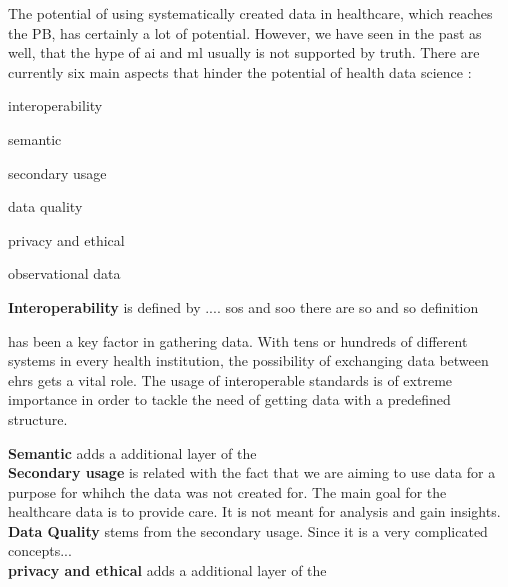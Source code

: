 The potential of using systematically created data in healthcare, which reaches the PB, has certainly a lot of potential. However, we have seen in the past as well, that the hype of \ac{ai} and \ac{ml} usually is not supported by truth. There are currently six main aspects that hinder the potential of health data science \cite{panchInconvenientTruthAI2019,peekThreeControversiesHealth2018}:
\begin{myitemize}
    \item interoperability
    \item semantic
    \item secondary usage
    \item data quality
    \item privacy and ethical
    \item observational data
\end{myitemize}

\textbf{Interoperability} is defined by .... sos and soo
there are so and so definition



has been a key factor in gathering data. With tens or hundreds of different systems in every health institution, the possibility of exchanging data between \acp{ehr} gets a vital role. The usage of interoperable standards is of extreme importance in order to tackle the need of getting data with a predefined structure.


\textbf{Semantic} adds a additional layer of the \\
\textbf{Secondary usage} is related with the fact that we are aiming to use data for a purpose for whihch the data was not created for. The main goal for the healthcare data is to provide care. It is not meant for analysis and gain insights.\\

\textbf{Data Quality} stems  from the secondary usage. Since it is a very complicated concepts...\\


\textbf{privacy and ethical} adds a additional layer of the \\


